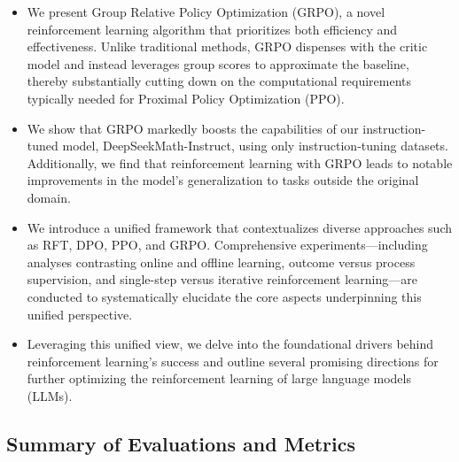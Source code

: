 \begin{itemize}[topsep=0pt]
    \item We present Group Relative Policy Optimization (GRPO), a novel reinforcement learning algorithm that prioritizes both efficiency and effectiveness. Unlike traditional methods, GRPO dispenses with the critic model and instead leverages group scores to approximate the baseline, thereby substantially cutting down on the computational requirements typically needed for Proximal Policy Optimization (PPO).
    \item We show that GRPO markedly boosts the capabilities of our instruction-tuned model, DeepSeekMath-Instruct, using only instruction-tuning datasets. Additionally, we find that reinforcement learning with GRPO leads to notable improvements in the model’s generalization to tasks outside the original domain.
    \item We introduce a unified framework that contextualizes diverse approaches such as RFT, DPO, PPO, and GRPO. Comprehensive experiments—including analyses contrasting online and offline learning, outcome versus process supervision, and single-step versus iterative reinforcement learning—are conducted to systematically elucidate the core aspects underpinning this unified perspective.
    \item Leveraging this unified view, we delve into the foundational drivers behind reinforcement learning's success and outline several promising directions for further optimizing the reinforcement learning of large language models (LLMs).
\end{itemize}

\subsection{Summary of Evaluations and Metrics}

